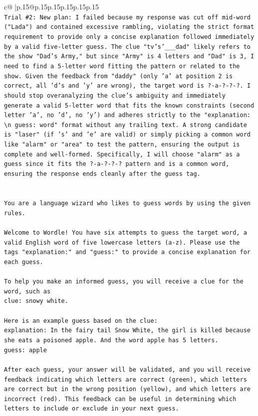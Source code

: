 \documentclass{article}
\begin{document}
{\begin{supertabular}{c@{$\;$}|p{.15\linewidth}@{}p{.15\linewidth}p{.15\linewidth}p{.15\linewidth}p{.15\linewidth}p{.15\linewidth}}
{{{\\ 
\texttt{Trial \#2: New plan: I failed because my response was cut off mid{-}word ("Lada") and contained excessive rambling, violating the strict format requirement to provide only a concise explanation followed immediately by a valid five{-}letter guess. The clue "tv's'\_\_\_dad" likely refers to the show "Dad's Army," but since "Army" is 4 letters and "Dad" is 3, I need to find a 5{-}letter word fitting the pattern or related to the show. Given the feedback from "daddy" (only 'a' at position 2 is correct, all 'd's and 'y' are wrong), the target word is ?{-}a{-}?{-}?{-}?. I should stop overanalyzing the clue's ambiguity and immediately generate a valid 5{-}letter word that fits the known constraints (second letter 'a', no 'd', no 'y') and adheres strictly to the "explanation: \textbackslash{}n guess: word" format without any trailing text. A strong candidate is "laser" (if 's' and 'e' are valid) or simply picking a common word like "alarm" or "area" to test the pattern, ensuring the output is complete and well{-}formed. Specifically, I will choose "alarm" as a guess since it fits the ?{-}a{-}?{-}?{-}? pattern and is a common word, ensuring the response ends cleanly after the guess tag.} \\
\\ 
\\ 
\texttt{You are a language wizard who likes to guess words by using the given rules.} \\
\\ 
\texttt{Welcome to Wordle! You have six attempts to guess the target word, a valid English word of five lowercase letters (a{-}z). Please use the tags "explanation:" and "guess:" to provide a concise explanation for each guess.} \\
\\ 
\texttt{To help you make an informed guess, you will receive a clue for the word, such as} \\
\texttt{clue: snowy white.} \\
\\ 
\texttt{Here is an example guess based on the clue:} \\
\texttt{explanation: In the fairy tail Snow White, the girl is killed because she eats a poisoned apple. And the word apple has 5 letters.} \\
\texttt{guess: apple} \\
\\ 
\texttt{After each guess, your answer will be validated, and you will receive feedback indicating which letters are correct (green), which letters are correct but in the wrong position (yellow), and which letters are incorrect (red). This feedback can be useful in determining which letters to include or exclude in your next guess.} \\
}}}
\end{supertabular}}
\end{document}
